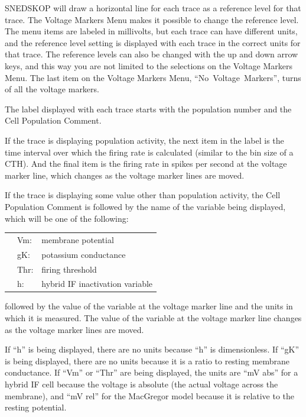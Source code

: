 \documentclass[12pt,openany,oneside]{book}
\newcommand{\tiw}[1]{\mbox{#1}}
\begin{document}
SNEDSKOP will draw a horizontal line for each trace as a reference
level for that trace.  The Voltage Markers Menu makes it possible to
change the reference level.  The menu items are labeled in millivolts,
but each trace can have different units, and the reference level
setting is displayed with each trace in the correct units for that
trace.  The reference levels can also be changed with the up and down
arrow keys, and this way you are not limited to the selections on the
Voltage Markers Menu.  The last item on the Voltage Markers Menu, ``\tiw{No
Voltage Markers}'', turns of all the voltage markers.

The label displayed with each trace starts with the population number
and the Cell Population Comment.

If the trace is displaying population activity, the next item in the
label is the time interval over which the firing rate is calculated
(similar to the bin size of a CTH).  And the final item is the firing
rate in spikes per second at the voltage marker line, which changes as
the voltage marker lines are moved.
\filbreak

If the trace is displaying some value other than population activity,
the Cell Population Comment is followed by the name of the variable
being displayed, which will be one of the following:
\begin{flushleft}
\begin{tabular}{@{}lll@{}}
& Vm: & membrane potential\\
& gK: & potassium conductance\\
& Thr: & firing threshold\\
& h: & hybrid IF inactivation variable\\
\end{tabular}
\end{flushleft}
\noindent followed by the value of the variable at the voltage marker line and
the units in which it is measured.  The value of the variable at the
voltage marker line changes as the voltage marker lines are moved.

If ``h'' is being displayed, there are no units because ``h'' is
dimensionless.  If ``gK'' is being displayed, there are no units
because it is a ratio to resting membrane conductance.  If ``Vm'' or
``Thr'' are being displayed, the units are ``mV abs'' for a hybrid IF
cell because the voltage is absolute (the actual voltage across the
membrane), and ``mV rel'' for the MacGregor model because it is
relative to the resting potential.
\end{document}
